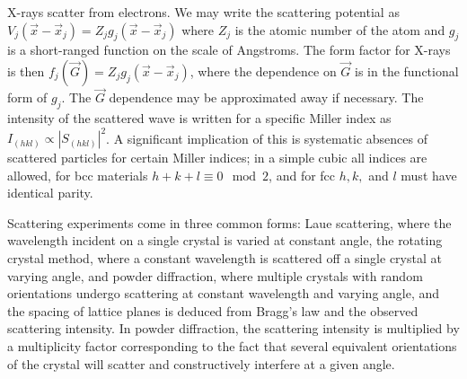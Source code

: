 \documentclass[10pt]{article}
\begin{document}
X-rays scatter from electrons.
We may write the scattering potential as $V_{j}(\vec{x}-\vec{x}_{j})=Z_{j}g_{j}(\vec{x}-\vec{x}_{j})$ where $Z_{j}$ is the atomic
number of the atom and $g_{j}$ is a short-ranged function on the scale of Angstroms.
The form factor for X-rays is then $f_{j}(\vec{G})=Z_{j}g_{j}(\vec{x}-\vec{x}_{j})$, where the dependence on $\vec{G}$ is in the
functional form of $g_{j}$.
The $\vec{G}$ dependence may be approximated away if necessary.
The intensity of the scattered wave is written for a specific Miller index as $I_{(hkl)}\propto |S_{(hkl)}|^{2}$.
A significant implication of this is systematic absences of scattered particles for certain Miller indices;
in a simple cubic all indices are allowed, for bcc materials $h+k+l \equiv 0\mod 2$, and for fcc $h,k,$ and $l$ must have identical
parity.

Scattering experiments come in three common forms: Laue scattering, where the wavelength incident on a single crystal is varied
at constant angle, the rotating crystal method, where a constant wavelength is scattered off a single crystal at varying angle,
and powder diffraction, where multiple crystals with random orientations undergo scattering at constant wavelength and varying angle,
and the spacing of lattice planes is deduced from Bragg's law and the observed scattering intensity.
In powder diffraction, the scattering intensity is multiplied by a multiplicity factor corresponding to the fact that several
equivalent orientations of the crystal will scatter and constructively interfere at a given angle.
\end{document}
